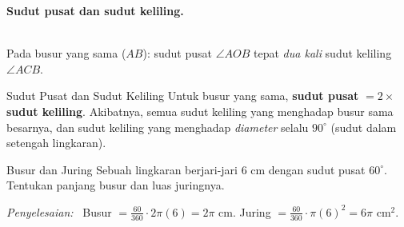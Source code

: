 \documentclass[11pt,a4paper]{report}
\theoremstyle{gaya}
\newcommand{\jawab}{\par\smallskip\noindent\textit{\textcolor{oranye}{Penyelesaian:}}\ }
\begin{document}
\smallskip\noindent\textbf{Sudut pusat dan sudut keliling.}
\begin{center}
\\
\small Pada busur yang sama ($AB$): sudut pusat $\angle AOB$ tepat \emph{dua kali} sudut keliling $\angle ACB$.
\end{center}

\begin{konsep}{Sudut Pusat dan Sudut Keliling}
Untuk busur yang sama, \textbf{sudut pusat} $=2\times$ \textbf{sudut keliling}. Akibatnya, semua sudut keliling yang menghadap busur sama besarnya, dan sudut keliling yang menghadap \emph{diameter} selalu $90^\circ$ (sudut dalam setengah lingkaran).
\end{konsep}

\begin{contoh}{Busur dan Juring}
Sebuah lingkaran berjari-jari 6 cm dengan sudut pusat $60^\circ$. Tentukan panjang busur dan luas juringnya.

\jawab
Busur $= \tfrac{60}{360}\cdot 2\pi(6) = 2\pi$ cm.
Juring $= \tfrac{60}{360}\cdot \pi(6)^2 = 6\pi$ cm$^2$.
\end{contoh}
\end{document}
